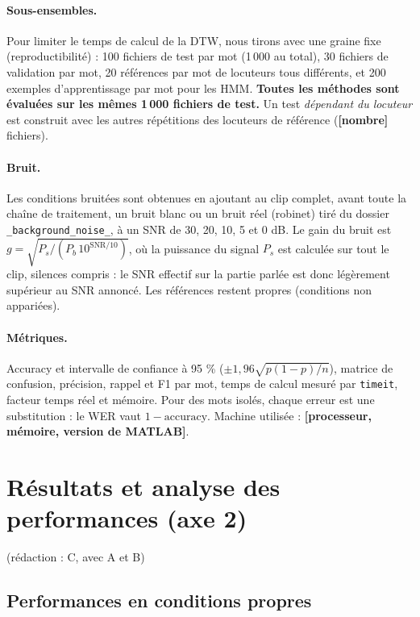 \documentclass[11pt,a4paper]{article}
\newcommand{\ar}[1]{\colorbox{jaune}{\textbf{\small [#1]}}}            %
\newcommand{\redaction}[1]{\hfill{\small\color{gray}(rédaction : #1)}}   %
\begin{document}
\paragraph{Sous-ensembles.} Pour limiter le temps de calcul de la DTW, nous tirons avec une graine fixe (reproductibilité) : 100 fichiers de test par mot (1\,000 au total), 30 fichiers de validation par mot, 20 références par mot de locuteurs tous différents, et 200 exemples d'apprentissage par mot pour les HMM. \textbf{Toutes les méthodes sont évaluées sur les mêmes 1\,000 fichiers de test.} Un test \emph{dépendant du locuteur} est construit avec les autres répétitions des locuteurs de référence (\ar{nombre} fichiers).

\paragraph{Bruit.} Les conditions bruitées sont obtenues en ajoutant au clip complet, avant toute la chaîne de traitement, un bruit blanc ou un bruit réel (robinet) tiré du dossier \texttt{\_background\_noise\_}, à un SNR de 30, 20, 10, 5 et 0 dB. Le gain du bruit est $g = \sqrt{P_s / (P_b\,10^{\text{SNR}/10})}$, où la puissance du signal $P_s$ est calculée sur tout le clip, silences compris : le SNR effectif sur la partie parlée est donc légèrement supérieur au SNR annoncé. Les références restent propres (conditions non appariées).

\paragraph{Métriques.} Accuracy et intervalle de confiance à 95 \% ($\pm 1{,}96\sqrt{p(1-p)/n}$), matrice de confusion, précision, rappel et F1 par mot, temps de calcul mesuré par \texttt{timeit}, facteur temps réel et mémoire. Pour des mots isolés, chaque erreur est une substitution : le WER vaut $1 - \text{accuracy}$. Machine utilisée : \ar{processeur, mémoire, version de MATLAB}.

\section{Résultats et analyse des performances (axe 2)}\label{sec:resultats}\redaction{C, avec A et B}

\subsection{Performances en conditions propres}
\end{document}
